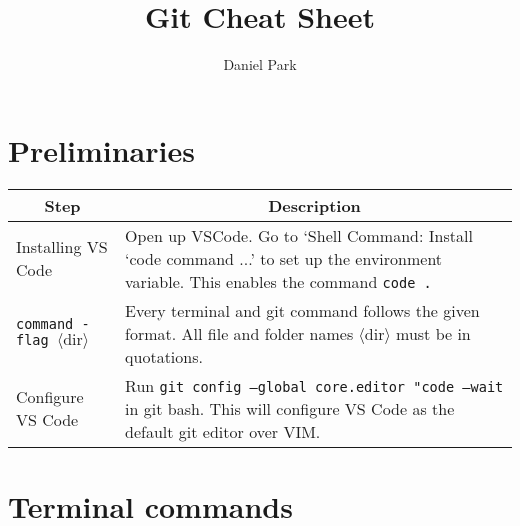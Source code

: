 \documentclass[12pt]{article}
\title{Git Cheat Sheet}
\author{Daniel Park}
\newcommand{\code}[1]{\texttt{#1}}
\newcommand{\filestr}[1]{$\langle \text{#1} \rangle$}
\begin{document}
\maketitle
\tableofcontents

\pagebreak

\section{Preliminaries}

\begin{center}
    \begin{tabular}{|p{}|p{}|}
    \hline
        \multicolumn{1}{|c|}{Step} & \multicolumn{1}{c|}{Description} \\
    \hline
        Installing VS Code & Open up VSCode. Go to `Shell Command: Install `code command ...' to set up the environment variable. This enables the command \code{code .} \\
    \hline
        \code{command -flag \filestr{dir}} & Every terminal and git command follows the given format. All file and folder names \filestr{dir} must be in quotations. \\
    \hline
        Configure VS Code & Run \code{git config --global core.editor "code --wait} in git bash. This will configure VS Code as the default git editor over VIM. \\
    \hline
    
    \end{tabular}
    
\end{center}
\section{Terminal commands}
\end{document}
